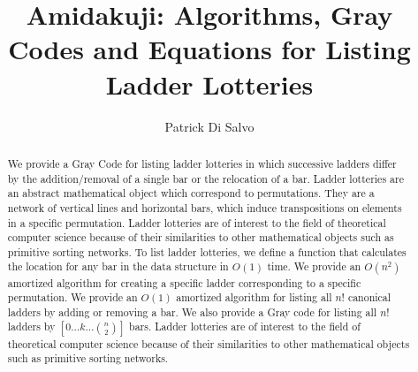 \documentclass[11pt,dvipsnames]{gthesis}
\begin{document}
\title{Amidakuji: Algorithms, Gray Codes and Equations for Listing Ladder Lotteries}

\author{Patrick Di Salvo}







\maketitle


\begin{abstract}

We provide a Gray Code for listing ladder lotteries in which successive ladders differ by the addition/removal of a single bar or 
the relocation of a bar. Ladder lotteries are an abstract mathematical object which correspond to permutations. They are a network of vertical lines 
and horizontal bars, which induce transpositions on elements in a specific permutation. 
Ladder lotteries are of interest to the field of theoretical computer science because of their similarities to other 
mathematical objects such as primitive sorting networks. 
To list ladder lotteries, we define a function that calculates the location for any bar in the data structure in $O(1)$ time. We provide an $O(n^2)$ amortized 
algorithm for creating a specific ladder corresponding to a specific permutation. We provide an $O(1)$ amortized algorithm for listing 
all $n!$ canonical ladders by adding or removing a bar. We also provide a Gray code for listing all $n!$ ladders by $[0 \dots k \dots {n \choose 2}]$ bars. 
Ladder lotteries are of interest to the field of theoretical computer science because of their similarities to other 
mathematical objects such as primitive sorting networks.

\medskip

\small
\centering

\end{abstract}
\end{document}
